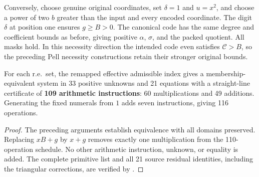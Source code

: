 Conversely, choose genuine original coordinates, set $\delta=1$
and $u=x^2$, and choose a power of two $b$ greater than the input
and every encoded coordinate. The digit $\delta$ at position one
ensures $g\ge B>0$. The canonical code has the same degree and
coefficient bounds as before, giving positive $\alpha$, $\sigma$,
and the packed quotient. All masks hold. In this necessity direction
the intended code even satisfies $\mathcal C>B$, so the preceding
Pell necessity constructions retain their stronger original bounds.

\begin{theorem}\label{thm:best109}
For each r.e.\ set, the remapped effective admissible index gives
a membership-equivalent system in 33 positive unknowns and 21 equations
with a straight-line certificate of \textbf{109 arithmetic instructions}:
60 multiplications and 49 additions. Generating the fixed numerals
from $1$ adds seven instructions, giving 116 operations.
\end{theorem}
\begin{proof}
The preceding arguments establish equivalence with all domains
preserved. Replacing $xB+g$ by $x+g$ removes exactly one multiplication
from the 110-operation schedule. No other arithmetic instruction,
unknown, or equality is added. The complete primitive list and all
21 source residual identities, including the triangular corrections,
are verified by .
\end{proof}
